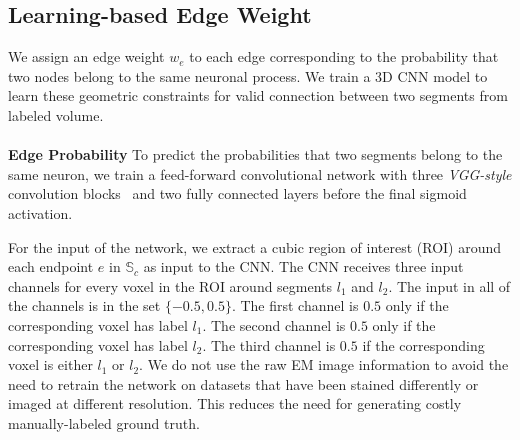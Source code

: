 \subsection{Learning-based Edge Weight}
\label{sec:edge-weights}
We assign an edge weight $w_e$ to each edge corresponding to the probability that two nodes belong to the same neuronal process.
We train a 3D CNN model to learn these geometric constraints for valid connection between two segments from labeled volume.
\\~\\
\noindent\textbf{Edge Probability}
To predict the probabilities that two segments belong to the same neuron, we train a feed-forward convolutional network with three \textit{VGG-style} convolution blocks~\cite{chatfield2014return} and two fully connected layers before the final sigmoid activation. 

For the input of the network, we extract a cubic region of interest (ROI) around each endpoint $e$ in $\mathbb{S}_c$ as input to the CNN. 
The CNN receives three input channels for every voxel in the ROI around segments $l_1$ and $l_2$. 
The input in all of the channels is in the set $\{-0.5, 0.5\}$. 
The first channel is $0.5$ only if the corresponding voxel has label $l_1$. 
The second channel is $0.5$ only if the corresponding voxel has label $l_2$. 
The third channel is $0.5$ if the corresponding voxel is either $l_1$ or $l_2$.
We do not use the raw EM image information to avoid the need to retrain the network on datasets that have been stained differently or imaged at different resolution. 
This reduces the need for generating costly manually-labeled ground truth. 




